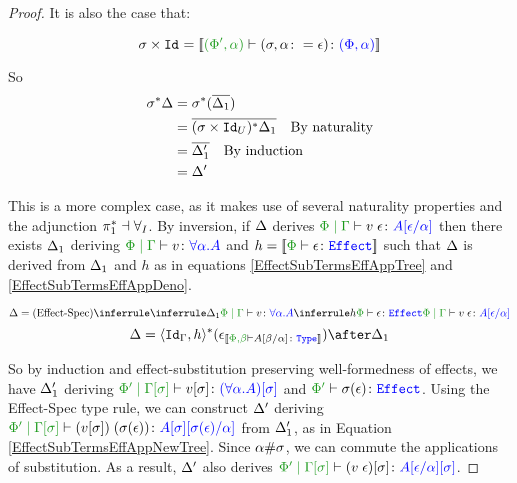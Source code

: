 \documentclass{Report}
\begin{document}
\begin{framed}
\begin{proof}
    It is also the case that:
    
    \begin{equation}
        \si\times\Id{} = \deno{\typerelation{(\P',\a)}{(\si, \a\setto\e)}{(\P,\a)}}
    \end{equation}
    
    So
    \begin{align*}
        \sigma^*\Delta &= \sigma^*(\overline{\Delta_1})\\
        & = \overline{(\sigma\times\texttt{Id}_{U})^*\Delta_1}\quad\text{By naturality}\\
        & = \overline{\Delta_1'}\quad\text{By induction}\\
        & = \Delta'
    \end{align*}
    
    \case{\vspec}
    
    This is a more complex case, as it makes use of several naturality properties and the adjunction $\pi_1^*\dashv\forall_I$. By inversion, if $\Delta$ derives $\gpetyperelation{\eapp{v}{\e}}{A\ssub{\a}{\e}}$ then there exists $\Delta_1$ deriving $\gpetyperelation{v}{\all{\a}{A}}$ and $h = \deno{\typerelation{\P}{\e}{\effect}}$ such that $\Delta$ is derived from $\Delta_1$ and $h$ as in equations \ref{EffectSubTermsEffAppTree} and \ref{EffectSubTermsEffAppDeno}.
    
    
    \begin{equation}\label{EffectSubTermsEffAppTree}
        \D = \ntreeruleII{\vspec}{\treeruleI{\D_1}{\gpetyperelation{v}{\all{\a}{A}}}}{\treeruleI{h}{\typerelation{\P}{\e}{\effect}}}{\gpetyperelation{\eapp{v}{\e}}{A\ssub{\a}{\e}}}
    \end{equation}
    \begin{equation}\label{EffectSubTermsEffAppDeno}
        \D = \pr{\Id{\G}}{h}\star(\e_{\deno{\typerelation{\P,\b}{A\ssub{\a}{\b}}{\type}}})\after\D_1
    \end{equation}
    
    So by induction and effect-substitution preserving well-formedness of effects, we have $\Delta_1'$ deriving $\etyperelation{\P'}{\G\ssi}{v\ssi}{(\all{\a}{A})\ssi}$ and $\wellformedeffect{\P'}{\si(\e)}$. Using the Effect-Spec type rule, we can construct $\Delta'$ deriving $\etyperelation{\P'}{\G\ssi}{\eapp{(v\ssi)}{(\si(\e))}}{A\ssi\ssub{\a}{\si(\e)}}$ from $\Delta_1'$, as in Equation \ref{EffectSubTermsEffAppNewTree}. Since $\alpha\#\sigma$, we can commute the applications of substitution. As a result, $\Delta'$ also derives $\etyperelation{\P'}{\G\ssi}{(\eapp{v}{\e})\ssi}{A\ssub{\a}{\e}\ssi}$.
    

\end{proof}
\end{framed}
\end{document}
